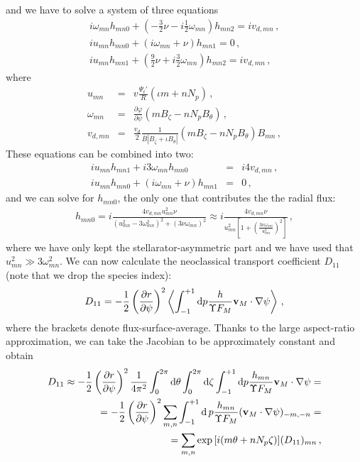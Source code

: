 and we have to solve a system of three equations
\begin{eqnarray}
i\omega_{mn}h_{mn0} + \left(-\frac{3}{2}\nu -i\frac{1}{2}\omega_{mn}\right)h_{mn2} = iv_{d,mn}\,,\nonumber\\
iu_{mn}h_{mn0} + (i\omega_{mn}+\nu) h_{mn1} = 0 \,,\nonumber\\
iu_{mn}h_{mn1}+\left(\frac{9}{2}\nu+i\frac{3}{2}\omega_{mn}\right)h_{mn2} = iv_{d,mn}\,,
\end{eqnarray}
where
\begin{eqnarray}
u_{mn} &=& v\frac{\Psi_t'}{R}(\iota m  + nN_p)\,,\nonumber\\
\omega_{mn} &=& \frac{\partial \varphi}{\partial\psi}(m B_\zeta-nN_p B_\theta)\,,\nonumber\\
v_{d,mn} & = &\frac{v_d}{2} \frac{1}{\overline{B}|B_\zeta+\iota B_\theta|} (m B_\zeta-n N_p B_\theta) B_{mn}  \,,
\end{eqnarray}
These equations can be combined into two:
\begin{eqnarray}
iu_{mn}h_{mn1} +i3\omega_{mn}h_{mn0} &=& i4v_{d,mn}\,,\nonumber\\
iu_{mn}h_{mn0} + (i\omega_{mn}+\nu) h_{mn1} &=& 0 \,,
\end{eqnarray}
and we can solve for $h_{mn0}$, the only one that contributes the the radial flux:
\begin{eqnarray}
h_{mn0} =i\frac{4v_{d,mn}u_{mn}^2\nu}{(u_{mn}^2-3\omega_{mn}^2)^2+(3\nu\omega_{mn})^2}\approx i\frac{4v_{d,mn}\nu}{u_{mn}^2\left[1+\left(\frac{3\nu\omega_{mn}}{u_{mn}^2}\right)^2\right]}\,,
\end{eqnarray}
where we have only kept the stellarator-asymmetric part and we have used that $u_{mn}^2\gg 3\omega_{mn}^2$. We can now calculate the neoclassical transport coefficient $D_{11}$ (note that we drop the species index):
\begin{equation}
D_{11}= -\frac{1}{2}\left(\frac{\partial r}{\partial\psi}\right)^2\left\langle{\int_{-1}^{+1}\mathrm{d}p \frac{h}{\Upsilon F_M} {\mathbf{v}}_M\cdot\mathbf{\nabla}\psi}\right\rangle\,,
\end{equation}
where the brackets denote flux-surface-average. Thanks to the large aspect-ratio approximation, we can take the Jacobian to be approximately constant and obtain 
\begin{eqnarray}
D_{11} \approx -\frac{1}{2}\left(\frac{\partial r}{\partial\psi}\right)^2\frac{1}{4\pi^2}\int_0^{2\pi}\mathrm{d}\theta\int_0^{2\pi}\mathrm{d}\zeta\int_{-1}^{+1}\mathrm{d}p \frac{h_{mn}}{\Upsilon F_M} {\mathbf{v}}_M\cdot\mathbf{\nabla} \psi = \nonumber \\ = -\frac{1}{2}\left(\frac{\partial r}{\partial\psi}\right)^2 \sum_{m,n}\int_{-1}^{+1}\mathrm{d}\,p \frac{h_{mn}}{\Upsilon F_M}({\mathbf{v}}_M\cdot\mathbf{\nabla}\psi)_{-m,-n} =\nonumber \\ = \sum_{m,n}\exp{[i(m\theta+nN_p\zeta)]} (D_{11})_{mn}\,,
\end{eqnarray}

